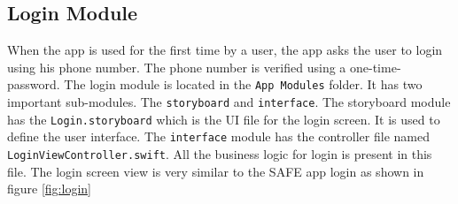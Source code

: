\documentclass[12pt, conference, a4paper]{article}
\begin{document}
\subsection{Login Module}
When the app is used for the first time by a user, the app asks the user to login using his phone number. The phone number is verified using a one-time-password. 
The login module is located in the \texttt{App Modules} folder. It has two important sub-modules. The \texttt{storyboard} and \texttt{interface}. The storyboard module has the \texttt{Login.storyboard} which is the UI file for the login screen. It is used to define the user interface. The \texttt{interface} module has the controller file named \texttt{LoginViewController.swift}. All the business logic for login is present in this file. 
The login screen view is very similar to the SAFE app login as shown in figure \ref{fig:login}\\
\end{document}
